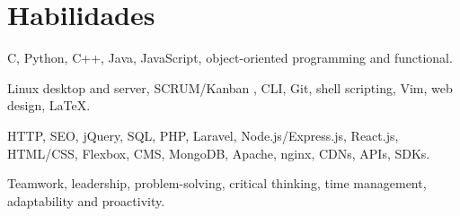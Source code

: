 \section{Habilidades}
{C, Python, C++, Java, JavaScript, object-oriented programming and functional.}

{Linux desktop and server, SCRUM/Kanban , CLI, Git, shell scripting, Vim, web design, {\LaTeX}.}

{HTTP, SEO, jQuery, SQL, PHP, Laravel, Node.js/Express.js, React.js, HTML/CSS, Flexbox, CMS, MongoDB, Apache, nginx, CDNs, APIs, SDKs.}

{Teamwork, leadership, problem-solving, critical thinking, time management, adaptability and proactivity.}
